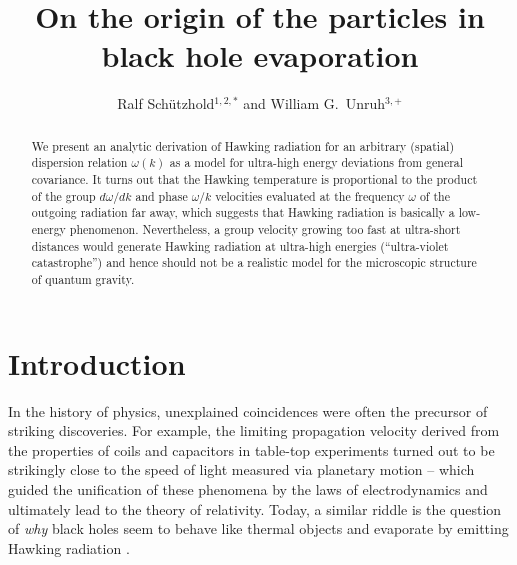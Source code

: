 \documentclass[12pt,aps,prl,showpacs,amssymb,nofootinbib,onecolumn]{revtex4-2}
\begin{document}
\title{On the origin of the particles in black hole evaporation} 

\author{Ralf Sch\"utzhold$^{1,2,*}$ and William G.~Unruh$^{3,+}$}


\begin{abstract}
\baselineskip=14pt
We present an analytic derivation of Hawking radiation for an
arbitrary (spatial) dispersion relation $\omega(k)$ as a model for
ultra-high energy deviations from general covariance. 
%
It turns out that the Hawking temperature is proportional to the
product of the group $d\omega/dk$ and phase $\omega/k$ velocities
evaluated at the frequency $\omega$ of the outgoing radiation far
away, which suggests that Hawking radiation is basically a low-energy
phenomenon. 
%
Nevertheless, a group velocity growing too fast at ultra-short
distances would generate Hawking radiation at ultra-high energies
(``ultra-violet catastrophe'') and hence should not be a realistic
model for the microscopic structure of quantum gravity.  
\end{abstract}

 
\maketitle

\section{Introduction}\quad
%
In the history of physics, unexplained coincidences were often the 
precursor of striking discoveries.
%
For example, the limiting propagation velocity derived from the
properties of coils and capacitors in table-top experiments turned out
to be strikingly close to the speed of light measured via planetary
motion -- which guided the unification of these phenomena by the laws
of electrodynamics and ultimately lead to the theory of relativity. 
%
Today, a similar riddle is the question of {\em why} black holes seem 
to behave like thermal objects \cite{thermo} and evaporate by emitting
Hawking radiation \cite{hawking,unruh,point}.  
\end{document}
